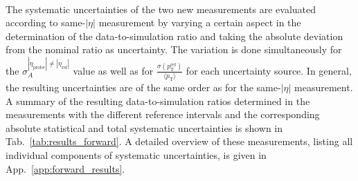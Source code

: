 \\
The systematic uncertainties of the two new measurements are evaluated according to same-$|\eta|$ measurement by varying a certain aspect in the determination of the data-to-simulation ratio and taking the absolute deviation from the nominal ratio as uncertainty. The variation is done simultaneously for the $\sigma^{ |\eta_{\mathrm{probe}}| \neq |\eta_{\mathrm{ref}}|}_{A}$ value as well as for $\frac{\sigma (p^\mathrm{ref}_\mathrm{T})}{{\langle p_\mathrm{T} \rangle}}$ for each uncertainty source. In general, the resulting uncertainties are of the same order as for the same-$|\eta|$ measurement. \\
A summary of the resulting data-to-simulation ratios determined in the measurements with the different reference intervals and the corresponding absolute statistical and total systematic uncertainties is shown in Tab.~\ref{tab:results_forward}. A detailed overview of these measurements, listing all individual components of systematic uncertainties, is given in App.~\ref{app:forward_results}. 

